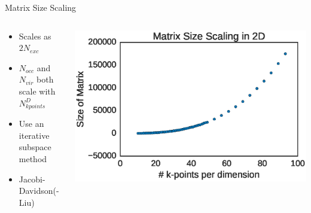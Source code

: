 \documentclass[10pt]{beamer}
\begin{document}
{{{{{{{{{{{\begin{frame}{Matrix Size Scaling}
	\begin{columns}[c] %
		\begin{column}{.4\textwidth}
			\begin{itemize}
				\item {Scales as $2N_{exc}$}
				\item {$N_{occ}$ and $N_{vir}$ both scale with $N_{kpoints}^D$}
				\item {Use an iterative subspace method }
				\item {Jacobi-Davidson(-Liu)}
			\end{itemize}
		\end{column}
		\hfill
		\begin{column}{0.6\textwidth}
		    \begin{overprint}
			    \includegraphics[width=\linewidth]{../images/matscale.eps}

			\end{overprint}
		\end{column}
	\end{columns}
\end{frame}


}}}}}}}}}}}
\end{document}
